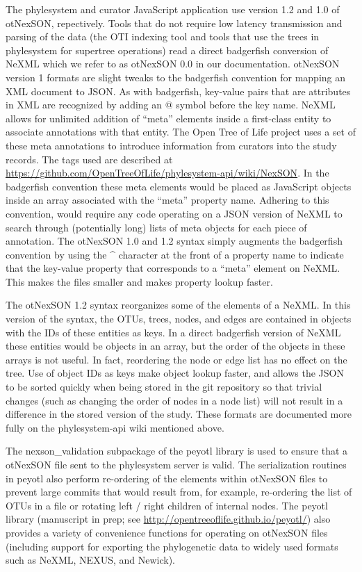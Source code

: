 \documentclass{bioinfo}
\newcommand{\ps}{phylesystem\xspace}
\newcommand{\otol}{Open Tree of Life\xspace}
\newcommand{\nexson}{otNexSON\xspace}
\newcommand{\js}{JavaScript\xspace}
\begin{document}
\begin{methods}
The \ps and curator \js application use version 1.2 and 1.0 of \nexson, repectively.
Tools that do not require low latency transmission and parsing of the data (the OTI indexing tool
    and tools that use the trees in \ps for supertree operations)
    read a direct badgerfish \citep{badgerfish} conversion of NeXML which we refer to as \nexson 0.0 in our documentation.
\nexson version 1 formats are slight tweaks to the badgerfish convention \citep{badgerfish} for mapping an XML document to JSON.
As with badgerfish, key-value pairs that are attributes in XML are recognized by adding an @ symbol before the key name.
NeXML allows for unlimited addition of ``meta'' elements inside a first-class entity to associate annotations with that entity.
The \otol project uses a set of these meta annotations to introduce information from curators into the study records.
The tags used are described at \url{https://github.com/OpenTreeOfLife/phylesystem-api/wiki/NexSON}.
In the badgerfish convention these meta elements would be placed as \js objects inside an array associated with the ``meta'' property name.
Adhering to this convention, would require any code operating on a JSON version of NeXML to search through (potentially
    long) lists of meta objects for each piece of annotation.
The \nexson 1.0 and 1.2 syntax simply augments the badgerfish convention by using the \^{} character at the front of a
    property name to indicate that the key-value property that corresponds to a ``meta'' element on NeXML.
This makes the files smaller and makes property lookup faster.

The \nexson 1.2 syntax reorganizes some of the elements of a NeXML.
In this version of the syntax, the OTUs, trees, nodes, and edges are contained in objects with the IDs of these entities as keys.
In a direct badgerfish version of NeXML these entities would be objects in an array, but the order of the objects
    in these arrays is not useful.
In fact, reordering the node or edge list has no effect on the tree.
Use of object IDs as keys make object lookup faster, and allows the JSON to be sorted quickly when being stored in 
    the git repository so that trivial changes (such as changing the order of nodes in a node list) will not result in 
    a difference in the stored version of the study.
These formats are documented more fully on the \ps-api wiki mentioned above.

The nexson\_validation subpackage of the peyotl library is used to ensure that a \nexson file sent to the \ps
    server is valid.
The serialization routines in peyotl also perform re-ordering of the elements within \nexson files to
    prevent large commits that would result from, for example, re-ordering the list of OTUs in a file or
    rotating left / right children of internal nodes.
The peyotl library (manuscript in prep; see \url{http://opentreeoflife.github.io/peyotl/}) also 
    provides a variety of convenience functions for operating on \nexson files (including support
    for exporting the phylogenetic data to widely used formats such as NeXML, NEXUS, and Newick).


\end{methods}
\end{document}
